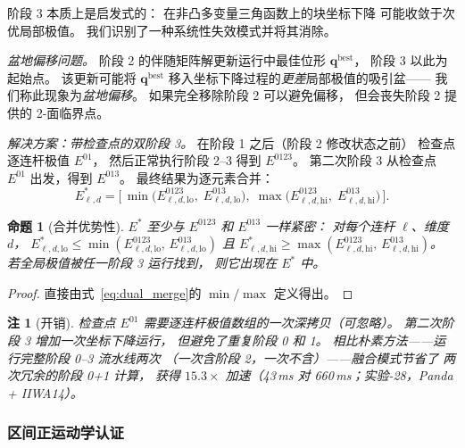 \documentclass[journal]{IEEEtran}
\newtheorem{remark}{注}
\newtheorem{proposition}{命题}
\begin{document}
阶段 3 本质上是启发式的：
在非凸多变量三角函数上的块坐标下降
可能收敛于次优局部极值。
我们识别了一种系统性失效模式并将其消除。

\emph{盆地偏移问题。}
阶段 2 的伴随矩阵解更新运行中最佳位形 $\bm{q}^\text{best}$，
阶段 3 以此为起始点。
该更新可能将 $\bm{q}^\text{best}$
移入坐标下降过程的\emph{更差}局部极值的吸引盆——
我们称此现象为\emph{盆地偏移}。
如果完全移除阶段 2 可以避免偏移，
但会丧失阶段 2 提供的 2-面临界点。

\emph{解决方案：带检查点的双阶段 3。}
在阶段 1 之后（阶段 2 修改状态之前）
检查点逐连杆极值 $E^{01}$，
然后正常执行阶段 2--3 得到 $E^{0123}$。
第二次阶段 3 从检查点 $E^{01}$ 出发，得到 $E^{013}$。
最终结果为逐元素合并：
\begin{equation}\label{eq:dual_merge}
  E^*_{\ell,d} = \bigl[\,
    \min\!\bigl(E^{0123}_{\ell,d,\mathrm{lo}},\;
                E^{013}_{\ell,d,\mathrm{lo}}\bigr),\;
    \max\!\bigl(E^{0123}_{\ell,d,\mathrm{hi}},\;
                E^{013}_{\ell,d,\mathrm{hi}}\bigr)
  \,\bigr].
\end{equation}

\begin{proposition}[合并优势性]\label{prop:merge}
$E^*$ 至少与 $E^{0123}$ 和 $E^{013}$ 一样紧密：
对每个连杆 $\ell$、维度 $d$，
$E^*_{\ell,d,\mathrm{lo}} \leq \min(E^{0123}_{\ell,d,\mathrm{lo}},\,
E^{013}_{\ell,d,\mathrm{lo}})$
且
$E^*_{\ell,d,\mathrm{hi}} \geq \max(E^{0123}_{\ell,d,\mathrm{hi}},\,
E^{013}_{\ell,d,\mathrm{hi}})$。
若全局极值被\emph{任一}阶段 3 运行找到，
则它出现在 $E^*$ 中。
\end{proposition}
\begin{proof}
直接由式~\eqref{eq:dual_merge}的 $\min/\max$ 定义得出。
\end{proof}

\begin{remark}[开销]
检查点 $E^{01}$ 需要逐连杆极值数组的一次深拷贝（可忽略）。
第二次阶段 3 增加一次坐标下降运行，
但\emph{避免}了重复阶段 0 和 1。
相比朴素方法——运行完整阶段 0--3 流水线两次
（一次含阶段 2，一次不含）——融合模式节省了
两次冗余的阶段 0+1 计算，
获得 $15.3\times$ 加速（43\,ms 对 660\,ms；实验-28，Panda + IIWA14）。
\end{remark}


\subsubsection{区间正运动学认证}\label{sec:ifk_cert}
\end{document}
